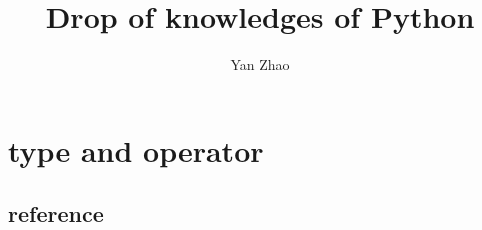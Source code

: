 \documentclass[a4paper,12pt,twoside]{book}
\begin{document}

\title{Drop of knowledges of Python}
\author{Yan Zhao}
\date{}\maketitle


	
\chapter{type and operator}
\section{reference}
\end{document}
